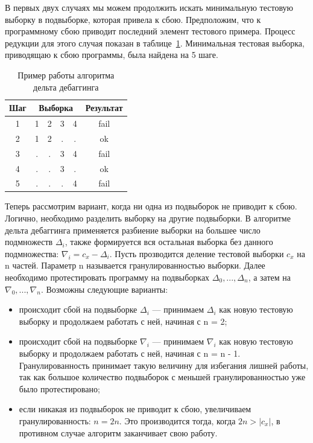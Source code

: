 В первых двух случаях мы можем продолжить искать минимальную тестовую выборку в подвыборке, которая привела к сбою. Предположим, что к программному сбою приводит последний элемент тестового примера. Процесс редукции для этого случая показан в таблице~\ref{tab:ddminex}. Минимальная тестовая выборка, приводящаю к сбою программы, была найдена на 5 шаге.
\begin{table}[]
\center
\caption{\label{tab:ddminex}Пример работы алгоритма дельта дебаггинга}
\begin{tabular}{| c | *{4}{c} | c |}
\hline
\bf Шаг & \multicolumn{4}{|c|}{\bf Выборка} & {\bf Результат}\\
\hline
1 &  1 & 2 & 3 & 4 & fail \\
\hline
2 &  1 & 2 & . & . & ok \\
\hline
3 &  . & . & 3 & 4 & fail \\
\hline
4 &  . & . & 3 & . & ok \\
\hline
5 &  . & . & . & 4 & fail \\
\hline
\end{tabular}
\end{table}

Теперь рассмотрим вариант, когда ни одна из подвыборок не приводит к сбою. Логично, необходимо разделить выборку на другие подвыборки. В алгоритме дельта дебаггинга применяется разбиение выборки на большее число подмножеств $\Delta_i$, также формируется вся остальная выборка без данного подмножества: $\nabla_i = c_x - \Delta_i$. Пусть прозводится деление тестовой выборки $c_x$ на n частей. Параметр n называется гранулированностью выборки. Далее необходимо протестировать программу на подвыборках $\Delta_0,...,\Delta_n$, а затем на $\nabla_0,...,\nabla_n$. Возможны следующие варианты:
\begin{itemize}
\item происходит сбой на подвыборке $\Delta_i$ --- принимаем $\Delta_i$ как новую тестовую выборку и продолжаем работать с ней, начиная с n = 2;
\item происходит сбой на подвыборке $\nabla_i$ --- принимаем $\nabla_i$ как новую тестовую выборку и продолжаем работать с ней, начиная с n = n - 1. Гранулированность принимает такую величину для избегания лишней работы, так как большое количество подвыборок с меньшей гранулированностью уже было протестировано;
\item если никакая из подвыборок не приводит к сбою, увеличиваем гранулированность: $n = 2n$. Это производится тогда, когда $2n > |c_x|$, в противном случае алгоритм заканчивает свою работу.
\end{itemize}

